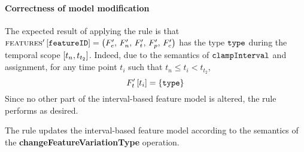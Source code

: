 \paragraph{Correctness of model modification}
The expected result of applying the rule is that $\textsc{features}' \left[ \texttt{featureID} \right] = \left(F'_e,\, F'_n,\, F'_t,\, F'_p,\, F'_c\right)$ has the type $\texttt{type}$ during the temporal scope $\interval{t_n}{t_{t_2}}$. Indeed, due to the semantics of $\texttt{clampInterval}$ and assignment, for any time point $t_i$ such that $t_n \leq t_i < t_{t_2}$,
\[
   F'_t \left[ t_i \right] = \left\{\texttt{type}\right\}
\]
Since no other part of the interval-based feature model is altered, the rule performs as desired.
\\

\begin{lemma}
   The  rule updates the interval-based feature model according to the semantics of the \textbf{changeFeatureVariationType} operation.
   \label{lemma:change-feature-variation-type-mod}
\end{lemma}
